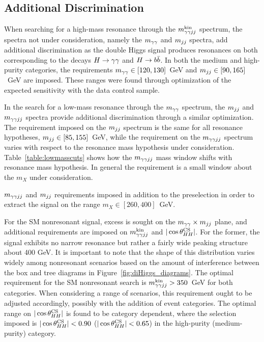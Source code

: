 \subsection{Additional Discrimination\label{subsec:add_discrimination}}

When searching for a high-mass resonance through the $m_{\gamma\gamma jj}^{\rm kin}$ spectrum, the spectra not under
consideration, namely the $m_{\gamma\gamma}$ and $m_{jj}$ spectra, add additional discrimination as the double Higgs
signal produces resonances on both corresponding to the decays $H\to\gamma\gamma$ and $H\to b\bar{b}$. In both
the medium and high-purity categories,
the requirements $m_{\gamma\gamma} \in [120, 130]$~GeV and $m_{jj} \in [90, 165]$~GeV
are imposed.
These ranges were found through optimization of the expected sensitivity with the data control sample.

In the search for a low-mass resonance through the $m_{\gamma\gamma}$ spectrum, the $m_{jj}$ and $m_{\gamma\gamma jj}$ spectra
provide additional discrimination through a similar optimization. The requirement imposed
on the $m_{jj}$ spectrum is the same for all resonance hypotheses, $m_{jj} \in [85,155]$~GeV, while the
requirement on the $m_{\gamma\gamma jj}$ spectrum varies with respect to the resonance mass hypothesis
under consideration.
Table~\ref{table:lowmasscuts} shows how the $m_{\gamma\gamma jj}$ mass window shifts with resonance mass hypothesis.
In general the requirement is a small window about the $m_X$ under consideration.

\begin{table}[ht]
  \centering
  \renewcommand{\arraystretch}{1.4}
  \caption{$m_{\gamma\gamma jj}$ and $m_{jj}$ requirements imposed in addition to the preselection in order to extract
the signal on the range $m_X \in [260, 400]$~GeV.}
  
  \label{table:lowmasscuts}
\end{table}

For the SM nonresonant signal, excess is sought on the $m_{\gamma\gamma} \times m_{jj}$ plane, and additional
requirements are imposed on $m_{\gamma\gamma jj}^{\rm kin}$ and $|\cos {\theta^{\rm CS}_{HH}}|$. For the former, the signal
exhibits no narrow resonance but rather a fairly wide peaking structure about 400 GeV. It is important
to note that the shape of this distribution varies widely among nonresonant scenarios based on
the amount of interference between the box and tree diagrams in Figure~\ref{fig:diHiggs_diagrams}.
The optimal requirement for the SM nonresonant search is $m_{\gamma\gamma jj}^{\rm kin} > 350$~GeV for both categories.
When considering a range of scenarios, this requirement ought to be adjusted accordingly,
possibly with the addition of event categories.
The optimal range on $|\cos {\theta^{\rm CS}_{HH}}|$ is found to be category dependent, where the selection imposed
is $|\cos {\theta^{\rm CS}_{HH}}| < 0.90$ ($|\cos {\theta^{\rm CS}_{HH}}| < 0.65$) in the high-purity (medium-purity) category.
